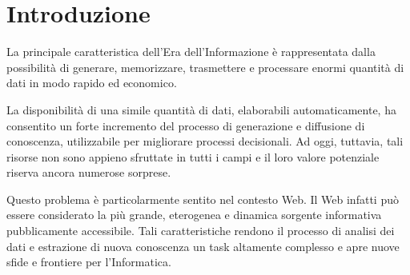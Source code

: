 
\cleardoublepage
\chapter*{Introduzione}

La principale caratteristica dell'Era dell'Informazione è rappresentata dalla possibilità di generare, memorizzare, trasmettere e processare enormi quantità di dati in modo rapido ed economico.

 La disponibilità di una simile quantità di dati, elaborabili automaticamente, ha consentito un forte incremento del processo di generazione e diffusione di conoscenza, utilizzabile per migliorare processi decisionali. Ad oggi, tuttavia, tali risorse non sono appieno sfruttate in tutti i campi e il loro valore potenziale riserva ancora numerose sorprese.

Questo problema è particolarmente sentito nel contesto Web. Il Web infatti può essere considerato la più grande, eterogenea e dinamica sorgente informativa pubblicamente accessibile. Tali caratteristiche rendono il processo di analisi dei dati e estrazione di nuova conoscenza un task altamente complesso e apre nuove sfide e frontiere per l'Informatica.


